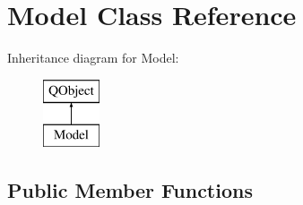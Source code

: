 \hypertarget{class_model}{\section{Model Class Reference}
\label{class_model}
}
Inheritance diagram for Model\-:\begin{figure}[H]
\begin{center}
\leavevmode
\includegraphics[height=2.000000cm]{class_model}
\end{center}
\end{figure}
\subsection*{Public Member Functions}
